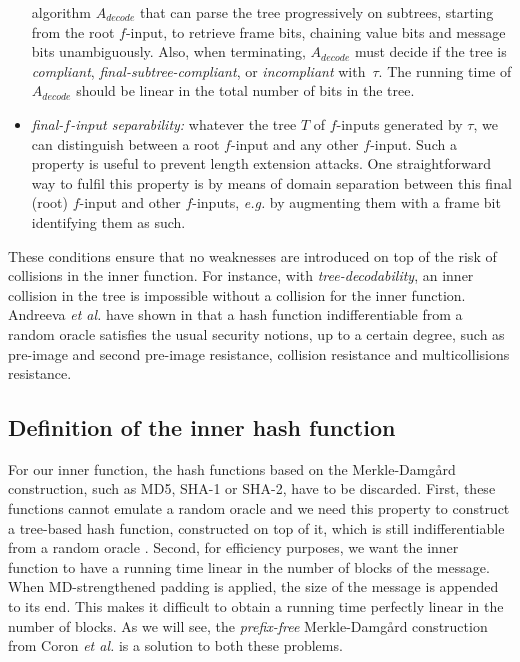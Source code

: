 \documentclass{llncs}
\begin{document}
\begin{itemize}
 algorithm $A_{decode}$ that can parse the tree progressively on subtrees, starting from the
root $f$-input, to retrieve frame bits, chaining value bits and message bits unambiguously. Also, when terminating, $A_{decode}$
must decide if the tree is \emph{compliant}, \emph{final-subtree-compliant}, or \emph{incompliant} with~$\tau$. 
The running time of $A_{decode}$ should be linear in the total number of bits in the tree.
\item \textit{final-$f$-input separability:}  
 whatever the tree $T$ of $f$-inputs generated by $\tau$, we can distinguish between a root $f$-input and any other $f$-input.
Such a property is useful to prevent length extension attacks. 
 One straightforward way to fulfil this property is by means of domain separation between this final (root) $f$-input and other $f$-inputs, \emph{e.g.} 
 by augmenting them with a frame bit identifying them as such.
\end{itemize}



These conditions ensure that no weaknesses are introduced on top of
the risk of collisions in the inner function. For instance, with \emph{tree-decodability}, an inner
 collision in the tree is impossible without a collision for the inner function.
Andreeva \textit{et al.} have shown in 
\cite{AMP10,AMP10isc}
that a hash function indifferentiable from a random oracle
satisfies the usual security notions, up to a certain degree, such as pre-image and second pre-image resistance, 
collision resistance and multicollisions resistance.

\subsection{Definition of the inner hash function}

For our inner function, the hash functions based on the Merkle-Damg{\aa}rd construction, such as MD5, SHA-1 or SHA-2, have to be discarded. 
First, these functions cannot emulate a random oracle and we need this property to construct a tree-based hash function, 
constructed on top of it, which is still indifferentiable from a random oracle \cite{BDPV14_Suf}. Second, for efficiency purposes,
we want the inner function to have a running time linear in the number of blocks of the message. When MD-strengthened padding
is applied, the size of the message is appended to its end. This makes it difficult to obtain a running time perfectly linear in the number 
of blocks. As we will see, the \emph{prefix-free} Merkle-Damg{\aa}rd construction from Coron \emph{et al.} \cite{CDMP05} is a solution to both these problems.
\end{document}
